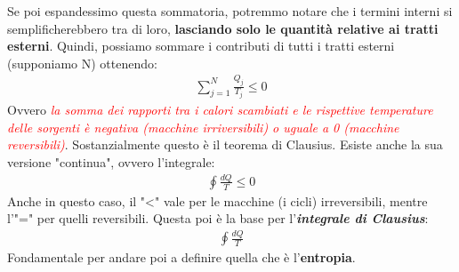             Se poi espandessimo questa sommatoria, potremmo notare che i termini interni si semplificherebbero tra di loro, \textbf{lasciando solo le quantità relative ai tratti esterni}. Quindi, possiamo sommare i contributi di tutti i tratti esterni (supponiamo N) ottenendo:
            \begin{align*}
                \sum_{j=1}^N\frac{Q_{j}}{T_{j}} \leq 0
            \end{align*}
            Ovvero \textit{\textcolor{Red}{la somma dei rapporti tra i calori scambiati e le rispettive temperature delle sorgenti è negativa (macchine irriversibili) o uguale a 0 (macchine reversibili)}}. Sostanzialmente questo è il teorema di Clausius. Esiste anche la sua versione "continua", ovvero l'integrale:
            \begin{align*}
                \oint\frac{dQ}{T} \leq 0
            \end{align*}
            Anche in questo caso, il "<" vale per le macchine (i cicli) irreversibili, mentre l'"=" per quelli reversibili. Questa poi è la base per l'\textbf{\textit{integrale di Clausius}}:
            \begin{align*}
                \oint\frac{dQ}{T}
            \end{align*}
            Fondamentale per andare poi a definire quella che è l'\textbf{entropia}.

